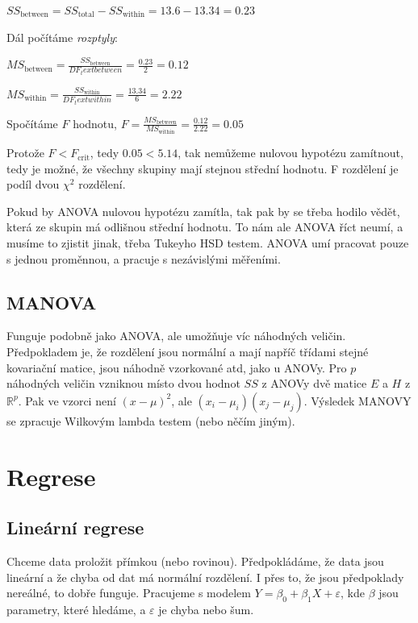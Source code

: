 \documentclass[10pt,a4paper]{article}
\begin{document}
\noindent $SS_\text{between} = SS_\text{total} - SS_\text{within} = 13.6 - 13.34 = 0.23$

Dál počítáme \textit{rozptyly}:

\noindent $MS_\text{between} = \frac{SS_\text{between}}{DF_text{between}} = \frac{0.23}{2} = 0.12$

\noindent $MS_\text{within} = \frac{SS_\text{within}}{DF_text{within}} = \frac{13.34}{6} = 2.22$

Spočítáme $F$ hodnotu, $F=\frac{MS_\text{between}}{MS_\text{within}} = \frac{0.12}{2.22} = 0.05$

Protože $F<F_\text{crit}$, tedy $0.05 < 5.14$, tak nemůžeme nulovou hypotézu zamítnout, tedy je možné, že všechny skupiny mají stejnou střední hodnotu. F rozdělení je podíl dvou $\chi^2$ rozdělení.

Pokud by ANOVA nulovou hypotézu zamítla, tak pak by se třeba hodilo vědět, která ze skupin má odlišnou střední hodnotu. To nám ale ANOVA říct neumí, a musíme to zjistit jinak, třeba Tukeyho HSD testem. ANOVA umí pracovat pouze s jednou proměnnou, a pracuje s nezávislými měřeními.

\subsection{MANOVA}

Funguje podobně jako ANOVA, ale umožňuje víc náhodných veličin. Předpokladem je, že rozdělení jsou normální a mají napříč třídami stejné kovariační matice, jsou náhodně vzorkované atd, jako u ANOVy. Pro $p$ náhodných veličin vzniknou místo dvou hodnot $SS$ z ANOVy dvě matice $E$ a $H$ z $\mathbb{R}^p$. Pak ve vzorci není $(x - \mu)^2$, ale $(x_i - \mu_i)(x_j - \mu_j)$. Výsledek MANOVY se zpracuje Wilkovým lambda testem (nebo něčím jiným).







\section{Regrese}

\subsection{Lineární regrese}

Chceme data proložit přímkou (nebo rovinou). Předpokládáme, že data jsou lineární a že chyba od dat má normální rozdělení. I přes to, že jsou předpoklady nereálné, to dobře funguje. Pracujeme s modelem $Y = \beta_0 + \beta_1 X + \varepsilon$, kde $\beta$ jsou parametry, které hledáme, a $\varepsilon$ je chyba nebo šum.
\end{document}
